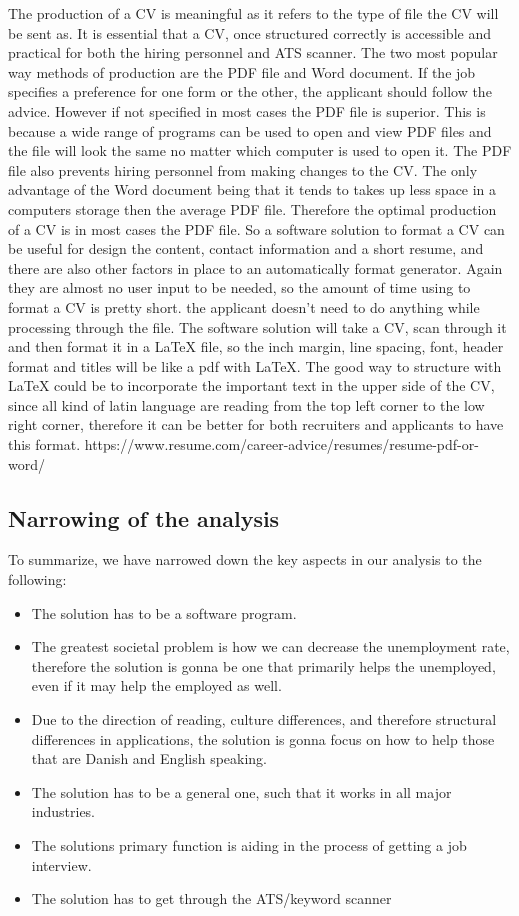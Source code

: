 The production of a CV is meaningful as it refers to the type of file the CV will be sent as.
It is essential that a CV, once structured correctly is accessible and practical for both the hiring personnel and ATS scanner.
The two most popular way methods of production are the PDF file and Word document.
If the job specifies a preference for one form or the other, the applicant should follow the advice.
However if not specified in most cases the PDF file is superior.
This is because a wide range of programs can be used to open and view PDF files and the file will look the same no matter which computer is used to open it.
The PDF file also prevents hiring personnel from making changes to the CV. 
The only advantage of the Word document being that it tends to takes up less space in a computers storage then the average PDF file.
Therefore the optimal production of a CV is in most cases the PDF file.
So a software solution to format a CV can be useful for design the content, contact information and a short resume,
and there are also other factors in place to an automatically format generator. Again they are almost no user input to be needed, 
so the amount of time using to format a CV is pretty short. 
the applicant doesn't need to do anything while processing through the file. The software solution will take a CV, scan through it and
then format it in a LaTeX file, so the inch margin, line spacing, font, header format and titles 
will be like a pdf with LaTeX. 
The good way to structure with LaTeX could be to incorporate the important text in the upper side of the CV, 
since all kind of latin language are reading from the top left corner to the low right corner, therefore it can be better
for both recruiters and applicants to have this format.
https://www.resume.com/career-advice/resumes/resume-pdf-or-word/

\subsection{Narrowing of the analysis}
To summarize, we have narrowed down the key aspects in our analysis to the
following:
\begin{itemize}
  \item The solution has to be a software program.
  \item The greatest societal problem is how we can decrease the unemployment rate, 
  therefore the solution is gonna be one that primarily helps the unemployed, 
  even if it may help the employed as well.
  \item Due to the direction of reading, culture differences, 
  and therefore structural differences in applications, the solution is gonna focus
  on how to help those that are Danish and English speaking.
  \item The solution has to be a general one, such that it works in all major industries.
  \item The solutions primary function is aiding in the process of getting a job interview.
  \item The solution has to get through the ATS/keyword scanner
\end{itemize}

